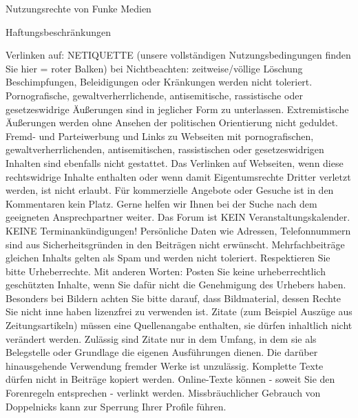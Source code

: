 Nutzungsrechte von Funke Medien 

Haftungsbeschränkungen



Verlinken auf:
NETIQUETTE (unsere vollständigen Nutzungsbedingungen finden Sie hier = roter Balken) 
bei Nichtbeachten: zeitweise/völlige Löschung
    Beschimpfungen, Beleidigungen oder Kränkungen werden nicht toleriert.
    Pornografische, gewaltverherrlichende, antisemitische, rassistische oder gesetzeswidrige Äußerungen sind in jeglicher Form zu unterlassen. Extremistische Äußerungen werden ohne Ansehen der politischen Orientierung nicht geduldet.
    Fremd- und Parteiwerbung und Links zu Webseiten mit pornografischen, gewaltverherrlichenden, antisemitischen, rassistischen oder gesetzeswidrigen Inhalten sind ebenfalls nicht gestattet.
    Das Verlinken auf Webseiten, wenn diese rechtswidrige Inhalte enthalten oder wenn damit Eigentumsrechte Dritter verletzt werden, ist nicht erlaubt.
    Für kommerzielle Angebote oder Gesuche ist in den Kommentaren kein Platz. Gerne helfen wir Ihnen bei der Suche nach dem geeigneten Ansprechpartner weiter.
    Das Forum ist KEIN Veranstaltungskalender. KEINE Terminankündigungen!
    Persönliche Daten wie Adressen, Telefonnummern sind aus Sicherheitsgründen in den Beiträgen nicht erwünscht.
    Mehrfachbeiträge gleichen Inhalts gelten als Spam und werden nicht toleriert.
    Respektieren Sie bitte Urheberrechte. Mit anderen Worten: Posten Sie keine urheberrechtlich geschützten Inhalte, wenn Sie dafür nicht die Genehmigung des Urhebers haben. Besonders bei Bildern achten Sie bitte darauf, dass Bildmaterial, dessen Rechte Sie nicht inne haben lizenzfrei zu verwenden ist.
    Zitate (zum Beispiel Auszüge aus Zeitungsartikeln) müssen eine Quellenangabe enthalten, sie dürfen inhaltlich nicht verändert werden. Zulässig sind Zitate nur in dem Umfang, in dem sie als Belegstelle oder Grundlage die eigenen Ausführungen dienen. Die darüber hinausgehende Verwendung fremder Werke ist unzulässig. Komplette Texte dürfen nicht in Beiträge kopiert werden. Online-Texte können - soweit Sie den Forenregeln entsprechen - verlinkt werden.
    Missbräuchlicher Gebrauch von Doppelnicks kann zur Sperrung Ihrer Profile führen.